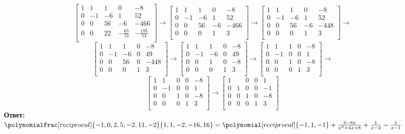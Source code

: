 \documentclass[a4paper]{article}
\begin{document}
\[
\left[
\begin{array}{cccc|c}
	1 & 1 & 1 & 0 & -8 \\
	0 & -1 & -6 & 1 & 52 \\
	0 & 0 & 56 & -6 & -466 \\
	0 & 0 & 22 & -\frac{65}{14} & -\frac{195}{14} \\		
\end{array}
\right]
\to
\left[
\begin{array}{cccc|c}
	1 & 1 & 1 & 0 & -8 \\
	0 & -1 & -6 & 1 & 52 \\
	0 & 0 & 56 & -6 & -466 \\
	0 & 0 & 0 & 1 & 3 \\		
\end{array}
\right]
\to
\left[
\begin{array}{cccc|c}
	1 & 1 & 1 & 0 & -8 \\
	0 & -1 & -6 & 1 & 52 \\
	0 & 0 & 56 & -6 & -448 \\
	0 & 0 & 0 & 1 & 3 \\			
\end{array}
\right]
\to\]
\[
\left[
\begin{array}{cccc|c}
	1 & 1 & 1 & 0 & -8 \\
	0 & -1 & -6 & 0 & 49 \\
	0 & 0 & 56 & 0 & -448 \\
	0 & 0 & 0 & 1 & 3 \\				
\end{array}
\right]
\to
\left[
\begin{array}{cccc|c}
	1 & 1 & 1 & 0 & -8 \\
	0 & -1 & -6 & 0 & 49 \\
	0 & 0 & 1 & 0 & -8 \\
	0 & 0 & 0 & 1 & 3 \\			
\end{array}
\right]
\to
\left[
\begin{array}{cccc|c}
	1 & 1 & 1 & 0 & -8 \\
	0 & -1 & 0 & 0 & 1 \\
	0 & 0 & 1 & 0 & -8 \\
	0 & 0 & 0 & 1 & 3 \\			
\end{array}
\right]
\to\]
\[
\left[
\begin{array}{cccc|c}
	1 & 1 & 0 & 0 & -8 \\
	0 & -1 & 0 & 0 & 1 \\
	0 & 0 & 1 & 0 & -8 \\
	0 & 0 & 0 & 1 & 3 \\				
\end{array}
\right]
\to
\left[
\begin{array}{cccc|c}
	1 &  & 0 & 0 & 1 \\
	0 & 1 & 0 & 0 & -1 \\
	0 & 0 & 1 & 0 & -8 \\
	0 & 0 & 0 & 1 & 3 \\			
\end{array}
\right]
\]
\textbf{Ответ:} $\polynomialfrac[reciprocal]{-1,0,2,5,-2,11,-2}{1,1,-2,-16,16}=\polynomial[reciprocal]{-1,1,-1}+\frac{3-8x}{x^2+4x+8}+\frac{1}{x-2}-\frac{1}{x-1}$ 
\end{document}
